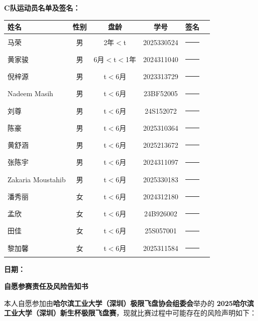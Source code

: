\documentclass{article}
\begin{document}
\noindent \textbf{C队运动员名单及签名：} \\
\begin{center}
\small %
\renewcommand{\arraystretch}{1.8} %
\begin{tabular}{lccccl}
    \toprule
    \textbf{姓名} & \textbf{性别} & \textbf{盘龄} & \textbf{学号} & \textbf{签名} \\[3pt] %
    \midrule
    马荣 & 男 & 2年$<$t & 2025330524 & \rule{3cm}{0.4pt} \\
    黄家骏 & 男 & 6月$<$t$<$1年 & 2024311040 & \rule{3cm}{0.4pt} \\
    倪梓源 & 男 & t$<$6月 & 2023313729 & \rule{3cm}{0.4pt} \\
    Nadeem Masih & 男 & t$<$6月 & 23BF52005 & \rule{3cm}{0.4pt} \\
    刘尊 & 男 & t$<$6月 & 24S152072 & \rule{3cm}{0.4pt} \\
    陈豪 & 男 & t$<$6月 & 2025310364 & \rule{3cm}{0.4pt} \\
    黄舒涵 & 男 & t$<$6月 & 2025213672 & \rule{3cm}{0.4pt} \\
    张陈宇 & 男 & t$<$6月 & 2024311097 & \rule{3cm}{0.4pt} \\
    Zakaria Moustahib & 男 & t$<$6月 & 2025330183 & \rule{3cm}{0.4pt} \\
    潘秀丽 & 女 & t$<$6月 & 2024312180 & \rule{3cm}{0.4pt} \\
    孟欣 & 女 & t$<$6月 & 24B926002 & \rule{3cm}{0.4pt} \\
    田佳 & 女 & t$<$6月 & 25S057001 & \rule{3cm}{0.4pt} \\
    黎加馨 & 女 & t$<$6月 & 2025311584 & \rule{3cm}{0.4pt} \\
    \bottomrule
\end{tabular}
\end{center}

\vspace{0.5cm} %
\noindent \textbf{日期：}
\newpage

\begin{center}
    \vspace*{-1.5cm} %
    {\fontsize{18pt}{28pt}\selectfont\textbf{自愿参赛责任及风险告知书}} %
    \vspace{0.5cm} %
\end{center}

本人自愿参加由\textbf{哈尔滨工业大学（深圳）极限飞盘协会组委会}举办的 \textbf{2025哈尔滨工业大学（深圳）新生杯极限飞盘赛}，现就比赛过程中可能存在的风险声明如下：
\end{document}
